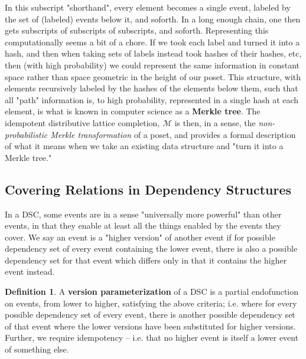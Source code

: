 \documentclass[hoptionsi,review,format=sigplan]{acmart}
\theoremstyle{definition}
\newtheorem{definition}{Definition}[section]
\newcommand{\Mcc}{\mathcal{M}}
\begin{document}
In this subscript "shorthand", every element becomes a single event, labeled by the set of (labeled) events below it, and soforth. In a long enough chain, one then gets subscripts of subscripts of subscripts, and soforth. Representing this computationally seems a bit of a chore. If we took each label and turned it into a hash, and then when taking sets of labels instead took hashes of their hashes, etc, then (with high probability) we could represent the same information in constant space rather than space geometric in the height of our poset. This structure, with elements recursively labeled by the hashes of the elements below them, such that all "path" information is, to high probability, represented in a single hash at each element, is what is known in computer science as a \textbf{Merkle tree}. The idempotent distributive lattice completion, \(\Mcc\) is then, in a sense, the \textit{non-probabilistic Merkle transformation} of a poset, and provides a formal description of what it means when we take an existing data structure and "turn it into a Merkle tree."




\subsection{Covering Relations in Dependency Structures}

In a DSC, some events are in a sense "universally more powerful" than other events, in that they enable at least all the things enabled by the events they cover. We say an event is a "higher version" of another event if for possible dependency set of every event containing the lower event, there is also a possible dependency set for that event which differs only in that it contains the higher event instead. 

\begin{definition}
A \textbf{version parameterization} of a DSC is a partial endofunction on events, from lower to higher, satisfying the above criteria; i.e. where for every possible dependency set of every event, there is another possible dependency set of that event where the lower versions have been substituted for higher versions. Further, we require idempotency -- i.e. that no higher event is itself a lower event of something else.
\end{definition}
\end{document}
